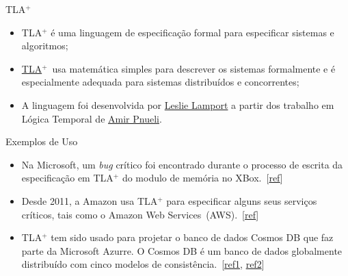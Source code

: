 \def\comment#1{{\hfil\scriptsize\color{gray}(* #1 *)}}
\def\tla{TLA$^+$}


\frame{\title{\insertlecture}\maketitle}

\begin{frame}{\tla}
  \begin{itemize}
  \item<1,4> \alert{\tla} é uma linguagem de especificação formal para especificar sistemas
    e algoritmos;
  \item<2,4> \href{https://lamport.azurewebsites.net/tla/tla.html}{\tla}~usa matemática simples para descrever os sistemas formalmente e é
    especialmente adequada para sistemas distribuídos e concorrentes;
  \item<3,4> A linguagem foi desenvolvida por
    \href{http://www.lamport.org/}{Leslie Lamport} a partir dos
    trabalho em Lógica Temporal de
    \href{https://cs.nyu.edu/faculty/pnueli/}{Amir Pnueli}.
  \end{itemize}
\end{frame}

\begin{frame}{Exemplos de Uso}\small
  \begin{itemize}[<+-| alert@+>]
  \item Na Microsoft, um \textit{bug} crítico foi encontrado durante o
    processo de escrita da especificação em TLA$^+$ do modulo de
    memória no
    XBox.~[\href{http://channel9.msdn.com/Events/Build/2014/3-642\#time=21m46s}{ref}]
  \item Desde 2011, a Amazon usa TLA$^+$ para especificar alguns seus
    serviços críticos, tais como o Amazon Web
    Services~(AWS).~[\href{http://lamport.azurewebsites.net/tla/amazon.html}{ref}]
  \item TLA$^+$ tem sido usado para projetar o banco de dados Cosmos
    DB que faz parte da Microsoft Azurre. O Cosmos DB é um banco de
    dados globalmente distribuído com cinco modelos de
    consistência.~[\href{https://techcrunch.com/2017/05/10/with-cosmos-db-microsoft-wants-to-build-one-database-to-rule-them-all/}{ref1},
    \href{https://techcrunch.com/2017/05/10/with-cosmos-db-microsoft-wants-to-build-one-database-to-rule-them-all/}{ref2}]
  \end{itemize}

\end{frame}

